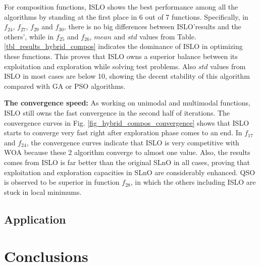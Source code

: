 \documentclass[a4paper,13pt,2p]{report}
\begin{document}
	For composition functions, ISLO shows the best performance among all the algorithms by standing at the first place in 6 out of 7 functions. Specifically, in $f_{24}$, $f_{27}$, $f_{29}$ and $f_{30}$, there is no big differences between ISLO'results and the others', while in $f_{25}$ and $f_{26}$, $mean$ and $std$ values from Table. \ref{tbl_results_hybrid_compos} indicates the dominance of ISLO in optimizing these functions. This proves that ISLO owns a superior balance between its exploitation and exploration while solving test problems. Also $std$ values from ISLO in most cases are below 10, showing the decent stability of this algorithm compared with GA or PSO algorithms.
	
	\textbf{The convergence speed:} As working on unimodal and multimodal functions, ISLO still owns the fast convergence in the second half of iterations. The convergence curves in Fig. \ref{fig_hybrid_compos_convergence} shows that ISLO starts to converge very fast right after exploration phase comes to an end. In $f_{17}$ and $f_{24}$, the convergence curves indicate that ISLO is very competitive with WOA because these 2 algorithm converge to almost one value. Also, the results comes from ISLO is far better than the original SLnO in all cases, proving that exploitation and exploration capacities in SLnO are considerably enhanced. QSO is observed to be superior in function $f_{28}$, in which the others including ISLO are stuck in local minimums.   

\section{Application}
\label{sec:exp_app}



\chapter{Conclusions}

\appendix



%
%
\end{document}
